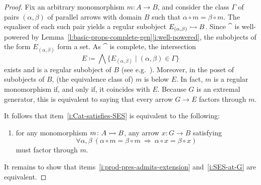 \documentclass[a4paper,10pt,reqno]{amsart}
\theoremstyle{definition}
\theoremstyle{remark}
\begin{document}
\begin{proof}
Fix an arbitrary monomorphism $m\colon A\to B$, and consider the class $\Gamma$ of pairs $(\alpha,\beta)$ of parallel arrows with domain $B$ such that $\alpha\circ m = \beta\circ m$. The equaliser of each such pair yields a regular subobject $E_{(\alpha,\beta)} \rightarrowtail B$. Since $\cat$ is well-powered by Lemma~\ref{l:basic-props-complete-gen}\ref{i:well-powered}, the subobjects of the form $E_{(\alpha,\beta)}$ form a set. As $\cat$ is complete, the intersection 
\[
E\coloneqq \bigwedge{\{E_{(\alpha,\beta)}\mid (\alpha,\beta)\in\Gamma\}}
\] 
exists and is a regular subobject of $B$ (see e.g.\ \cite[\S 14.5.1]{Schubert1972}). Moreover, in the poset of subobjects of $B$, (the equivalence class of) $m$ is below $E$. In fact, $m$ is a regular monomorphism if, and only if, it coincides with $E$. Because $G$ is an extremal generator, this is equivalent to saying that every arrow $G\to E$ factors through $m$. 

It follows that item~\ref{i:Cat-satisfies-SES} is equivalent to the following:
\begin{enumerate}[label=(\arabic*),resume=implicitops-SES]
\item\label{i:SES-at-G} for any monomorphism $m\colon A\rightarrowtail B$, any arrow $x\colon G \to B$ satisfying
\[
\forall \alpha,\beta \ (\alpha\circ m = \beta\circ m \ \Rightarrow \ \alpha\circ x = \beta\circ x)
\]
must factor through $m$.
\end{enumerate}
It remains to show that items~\ref{i:prod-pres-admits-extension} and~\ref{i:SES-at-G} are equivalent.



\end{proof}
\end{document}
